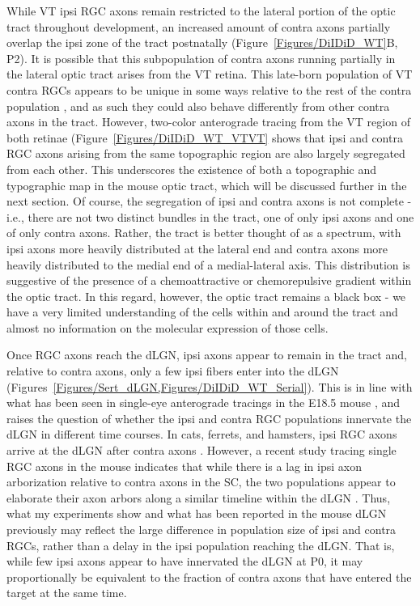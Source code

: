 While VT ipsi RGC axons remain restricted to the lateral portion of the optic tract throughout development, an increased amount of contra axons partially overlap the ipsi zone of the tract postnatally (Figure~\ref{Figures/DiIDiD_WT}B, P2).
It is possible that this subpopulation of contra axons running partially in the lateral optic tract arises from the VT retina.
This late-born population of VT contra RGCs appears to be unique in some ways relative to the rest of the contra population \cite{williams2006role}, and as such they could also behave differently from other contra axons in the tract.
However, two-color anterograde tracing from the VT region of both retinae (Figure~\ref{Figures/DiIDiD_WT_VTVT} shows that ipsi and contra RGC axons arising from the same topographic region are also largely segregated from each other.
This underscores the existence of both a topographic and typographic map in the mouse optic tract, which will be discussed further in the next section.
Of course, the segregation of ipsi and contra axons is not complete - i.e., there are not two distinct bundles in the tract, one of only ipsi axons and one of only contra axons.
Rather, the tract is better thought of as a spectrum, with ipsi axons more heavily distributed at the lateral end and contra axons more heavily distributed to the medial end of a medial-lateral axis.
This distribution is suggestive of the presence of a chemoattractive or chemorepulsive gradient within the optic tract.
In this regard, however, the optic tract remains a black box - we have a very limited understanding of the cells within and around the tract and almost no information on the molecular expression of those cells.

Once RGC axons reach the dLGN, ipsi axons appear to remain in the tract and, relative to contra axons, only a few ipsi fibers enter into the dLGN (Figures~\ref{Figures/Sert_dLGN,Figures/DiIDiD_WT_Serial}).
This is in line with what has been seen in single-eye anterograde tracings in the E18.5 mouse \cite{godement1987study}, and raises the question of whether the ipsi and contra RGC populations innervate the dLGN in different time courses.
In cats, ferrets, and hamsters, ipsi RGC axons arrive at the dLGN after contra axons \cite{shatz1983prenatal,frost1979postnatal,linden1981dorsal}.
However, a recent study tracing single RGC axons in the mouse indicates that while there is a lag in ipsi axon arborization relative to contra axons in the SC, the two populations appear to elaborate their axon arbors along a similar timeline within the dLGN \cite{dhande2011development}.
Thus, what my experiments show and what has been reported in the mouse dLGN previously \cite{godement1987study} may reflect the large difference in population size of ipsi and contra RGCs, rather than a delay in the ipsi population reaching the dLGN.
That is, while few ipsi axons appear to have innervated the dLGN at P0, it may proportionally be equivalent to the fraction of contra axons that have entered the target at the same time.